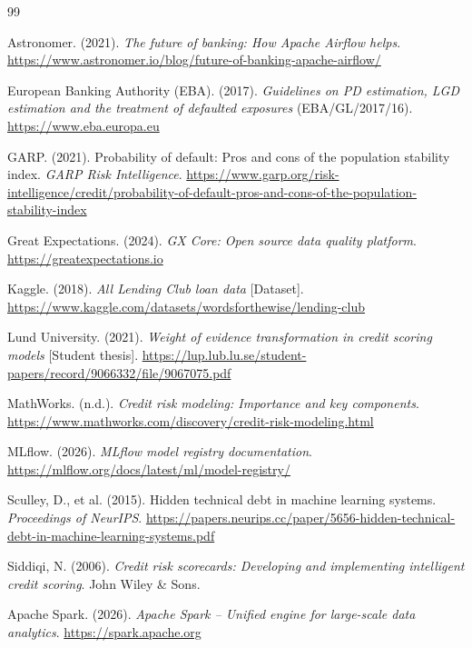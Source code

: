\documentclass[12pt,a4paper]{report}
\begin{document}
\begin{thebibliography}{99}

Astronomer. (2021). \textit{The future of banking: How Apache Airflow helps}. \url{https://www.astronomer.io/blog/future-of-banking-apache-airflow/}

European Banking Authority (EBA). (2017). \textit{Guidelines on PD estimation, LGD estimation and the treatment of defaulted exposures} (EBA/GL/2017/16). \url{https://www.eba.europa.eu}

GARP. (2021). Probability of default: Pros and cons of the population stability index. \textit{GARP Risk Intelligence}. \url{https://www.garp.org/risk-intelligence/credit/probability-of-default-pros-and-cons-of-the-population-stability-index}

Great Expectations. (2024). \textit{GX Core: Open source data quality platform}. \url{https://greatexpectations.io}

Kaggle. (2018). \textit{All Lending Club loan data} [Dataset]. \url{https://www.kaggle.com/datasets/wordsforthewise/lending-club}

Lund University. (2021). \textit{Weight of evidence transformation in credit scoring models} [Student thesis]. \url{https://lup.lub.lu.se/student-papers/record/9066332/file/9067075.pdf}

MathWorks. (n.d.). \textit{Credit risk modeling: Importance and key components}. \url{https://www.mathworks.com/discovery/credit-risk-modeling.html}

MLflow. (2026). \textit{MLflow model registry documentation}. \url{https://mlflow.org/docs/latest/ml/model-registry/}

Sculley, D., et al. (2015). Hidden technical debt in machine learning systems. \textit{Proceedings of NeurIPS}. \url{https://papers.neurips.cc/paper/5656-hidden-technical-debt-in-machine-learning-systems.pdf}

Siddiqi, N. (2006). \textit{Credit risk scorecards: Developing and implementing intelligent credit scoring}. John Wiley \& Sons.

Apache Spark. (2026). \textit{Apache Spark -- Unified engine for large-scale data analytics}. \url{https://spark.apache.org}


\end{thebibliography}
\end{document}
